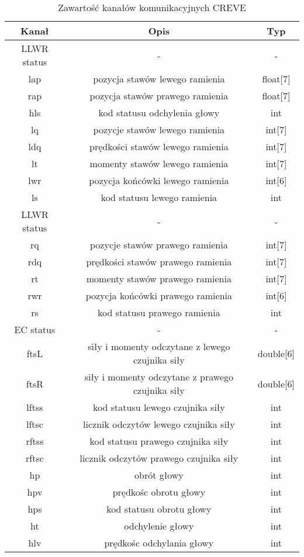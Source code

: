 \documentclass[]{article}
\begin{document}
\begin{table}[H]
	\begin{tabular}{||c|cc||}
		\hline
		Kanał & Opis & Typ \\
		\hline\hline
		LLWR status & - & - \\
		lap & pozycja stawów lewego ramienia & float[7] \\
		rap & pozycja stawów prawego ramienia & float[7] \\
		hls & kod statusu odchylenia głowy & int \\
		lq & pozycje stawów lewego ramienia & int[7] \\
		ldq & prędkości stawów lewego ramienia & int[7]\\
		lt & momenty stawów lewego ramienia & int[7]\\
		lwr & pozycja końcówki lewego ramienia & int[6]\\
		ls & kod statusu lewego ramienia & int\\
		LLWR status & - & - \\
		rq & pozycje stawów prawego ramienia & int[7]\\
		rdq & prędkości stawów prawego ramienia & int[7]\\
		rt & momenty stawów prawego ramienia & int[7]\\
		rwr & pozycja końcówki prawego ramienia & int[6]\\
		rs & kod statusu prawego ramienia & int\\
		EC status & - & - \\
		ftsL & siły i momenty odczytane z lewego czujnika siły & double[6] \\
		ftsR & siły i momenty odczytane z prawego czujnika siły & double[6] \\
		lftss & kod statusu lewego czujnika siły & int \\
		lftsc & licznik odczytów lewego czujnika siły & int \\
		rftss & kod statusu prawego czujnika siły & int \\
		rftsc & licznik odczytów prawego czujnika siły & int \\
		hp & obrót głowy & int \\
		hpv & prędkośc  obrotu głowy & int \\
		hps & kod statusu obrotu głowy & int \\ 
		ht & odchylenie głowy & int \\
		hlv & prędkośc  odchylania głowy & int \\
		\hline
	\end{tabular}
	\caption{Zawartość kanałów komunikacyjnych CREVE}
\end{table}
\end{document}
